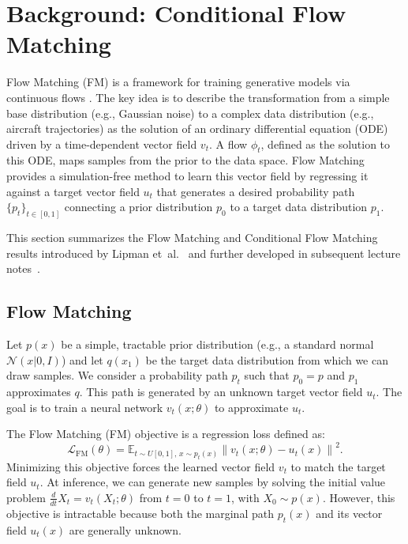 \documentclass[
  manuscript=proceedings,  %
  layout=preprint,  %
  year=20xx,
  volume=x,
]{extra/joas}
\begin{document}
\section{Background: Conditional Flow Matching}
\label{sec:background-cfm}

Flow Matching (FM) is a framework for training generative models via continuous flows \cite{lipman2023flowmatching, liu2022flow}. The key idea is to describe the transformation from a simple base distribution (e.g., Gaussian noise) to a complex data distribution (e.g., aircraft trajectories) as the solution of an ordinary differential equation (ODE) driven by a time-dependent vector field  $v_t$. A flow $\phi_t$, defined as the solution to this ODE, maps samples from the prior to the data space. Flow Matching provides a simulation-free method to learn this vector field by regressing it against a target vector field $u_t$ that generates a desired probability path $\{p_t\}_{t \in [0,1]}$ connecting a prior distribution $p_0$ to a target data distribution $p_1$.

This section summarizes the Flow Matching and Conditional Flow Matching results introduced by Lipman et~al.~\cite{lipman2023flowmatching} and further developed in subsequent lecture notes~\cite{flowsanddiffusions2025}.

\subsection{Flow Matching}
Let $p(x)$ be a simple, tractable prior distribution (e.g., a standard normal $\mathcal{N}(x|0,I)$) and let $q(x_1)$ be the target data distribution from which we can draw samples. We consider a probability path $p_t$ such that $p_0=p$ and $p_1$ approximates $q$. This path is generated by an unknown target vector field $u_t$. The goal is to train a neural network $v_t(x;\theta)$ to approximate $u_t$.

The Flow Matching (FM) objective is a regression loss defined as:
\begin{equation}
\mathcal{L}_{\mathrm{FM}}(\theta) = \mathbb{E}_{t \sim U[0,1],\, x \sim p_t(x)} \left\lVert v_t(x;\theta) - u_t(x) \right\rVert^2.
\label{eq:fm-loss}
\end{equation}
Minimizing this objective forces the learned vector field $v_t$ to match the target field $u_t$. At inference, we can generate new samples by solving the initial value problem $\frac{d}{dt}X_t = v_t(X_t;\theta)$ from $t=0$ to $t=1$, with $X_0 \sim p(x)$. However, this objective is intractable because both the marginal path $p_t(x)$ and its vector field $u_t(x)$ are generally unknown.
\end{document}
